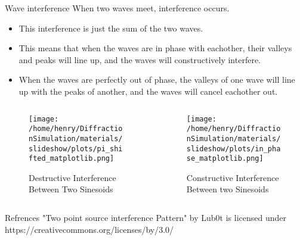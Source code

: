 \documentclass[aspectratio=169]{beamer}
\begin{document}
\begin{frame}{Wave interference}
	When two waves meet, interference occurs.
	\begin{itemize}
	\item This interference is just the sum of the two waves.
	\item This means that when the waves are in phase with eachother, their valleys and peaks will line up, and the waves will constructively interfere.
	\item When the waves are perfectly out of phase, the valleys of one wave will line up with the peaks of another, and the waves will cancel eachother out.
	\end{itemize}
	

\begin{columns}[c]	

	\begin{column}{.5\textwidth}
		\begin{figure}
		\texttt{[image: /home/henry/DiffractionSimulation/materials/slideshow/plots/pi\_shifted\_matplotlib.png]}
		\caption{Destructive Interference Between Two Sinesoids}
		\end{figure}
	\end{column}
	

	
	\begin{column}{.5\textwidth}
		\begin{figure}
			\texttt{[image: /home/henry/DiffractionSimulation/materials/slideshow/plots/in\_phase\_matplotlib.png]}
			\caption{Constructive Interference Between two Sinesoids}
		\end{figure}
	\end{column}
\end{columns}

\end{frame}

\begin{frame}{Refrences}
	"Two point source interference Pattern" by Lub0t is licensed under https://creativecommons.org/licenses/by/3.0/
\end{frame}
\end{document}
